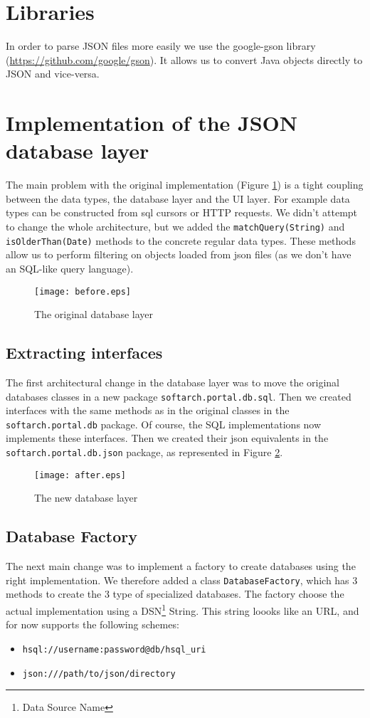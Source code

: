 \section{Libraries}

In order to parse JSON files more easily we use the google-gson library (\url{https://github.com/google/gson}). It allows us to convert Java objects directly to JSON and vice-versa.

\section{Implementation of the JSON database layer}

The main problem with the original implementation (Figure \ref{fig:before}) is a tight coupling between the data types, the database layer and the UI layer. For example data types can be constructed from sql cursors or HTTP requests. We didn't attempt to change the whole architecture, but we added the \texttt{matchQuery(String)} and \texttt{isOlderThan(Date)} methods to the concrete regular data types. These methods allow us to perform filtering on objects loaded from json files (as we don't have an SQL-like query language).

\begin{figure}[p]
  \texttt{[image: before.eps]}
  \caption{\label{fig:before}The original database layer}
\end{figure}

\subsection{Extracting interfaces}
The first architectural change in the database layer was to move the original databases classes in a new package \texttt{softarch.portal.db.sql}. Then we created interfaces with the same methods as in the original classes in the \texttt{softarch.portal.db} package. Of course, the SQL implementations now implements these interfaces. Then we created their json equivalents in the \texttt{softarch.portal.db.json} package, as represented in Figure \ref{fig:after}.

\begin{figure}[p]
  \texttt{[image: after.eps]}
  \caption{\label{fig:after}The new database layer}
\end{figure}

\subsection{Database Factory}
The next main change was to implement a factory to create databases using the
right implementation. We therefore added a class \texttt{DatabaseFactory}, which
has 3 methods to create the 3 type of specialized databases. The factory choose
the actual implementation using a DSN\footnote{Data Source Name} String. This string
loooks like an URL, and for now supports the following schemes:
\begin{itemize}
  \item \texttt{hsql://username:password@db/hsql\_uri}
  \item \texttt{json:///path/to/json/directory}
\end{itemize}

